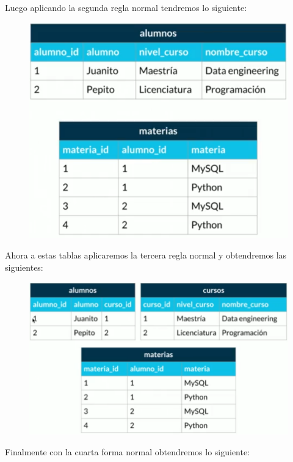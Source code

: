 \documentclass{article}
\begin{document}
Luego aplicando la segunda regla normal tendremos lo siguiente:
\begin{figure}[h!]
    \centering
      \includegraphics[scale=0.5]{./Pictures/024_segunda_normal.png}
\end{figure}

Ahora a estas tablas aplicaremos la tercera regla normal y obtendremos las siguientes:

\begin{figure}[h!]
    \centering
      \includegraphics[scale=0.45]{./Pictures/025_tercera_normal.png}
\end{figure}

Finalmente con la cuarta forma normal obtendremos lo siguiente:
\end{document}
